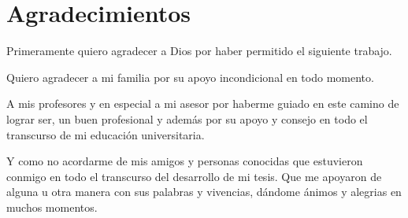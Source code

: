 \chapter*{Agradecimientos}
    
Primeramente quiero agradecer a Dios por haber permitido el siguiente trabajo.

Quiero agradecer a mi familia por su apoyo incondicional en todo momento.

A mis profesores y en especial a mi asesor por haberme guiado en este camino de lograr ser, un buen profesional y además por su apoyo y consejo en todo el transcurso de mi educación universitaria.

Y como no acordarme de mis amigos y personas conocidas que estuvieron conmigo en todo el transcurso del desarrollo de mi tesis. Que me apoyaron de alguna u otra manera con sus palabras y vivencias, dándome ánimos y alegrias en muchos momentos.

